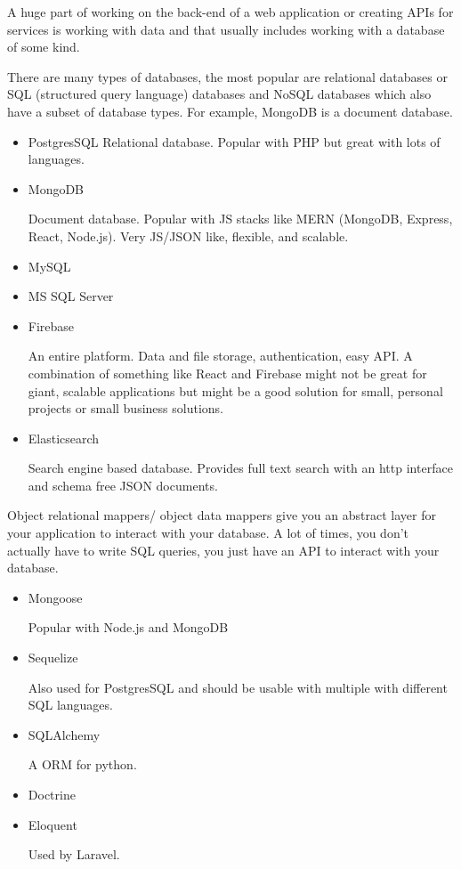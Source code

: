 A huge part of working on the back-end of a web application or creating APIs for services is working with data and that usually includes working with a database of some kind. 

There are many types of databases, the most popular are relational databases or SQL (structured query language) databases and NoSQL databases which also have a subset of database types. For example, MongoDB is a document database. 

\begin{itemize}
    \item PostgresSQL
    Relational database. Popular with PHP but great with lots of languages.
    \item MongoDB
    
    Document database. Popular with JS stacks like MERN (MongoDB, Express, React, Node.js). Very JS/JSON like, flexible, and scalable.
    \item MySQL
    \item MS SQL Server
    \item Firebase
    
    An entire platform. Data and file storage, authentication, easy API. A combination of something like React and Firebase might not be great for giant, scalable applications but might be a good solution for small, personal projects or small business solutions. 
    \item Elasticsearch
    
    Search engine based database. Provides full text search with an http interface and schema free JSON documents.
\end{itemize}

Object relational mappers/ object data mappers give you an abstract layer for your application to interact with your database. A lot of times, you don't actually have to write SQL queries, you just have an API to interact with your database.

\begin{itemize}
    \item Mongoose
    
    Popular with Node.js and MongoDB
    \item Sequelize
    
    Also used for PostgresSQL and should be usable with multiple with different SQL languages. 
    \item SQLAlchemy
    
    A ORM for python.
    \item Doctrine
    \item Eloquent
    
    Used by Laravel.
    
\end{itemize}

